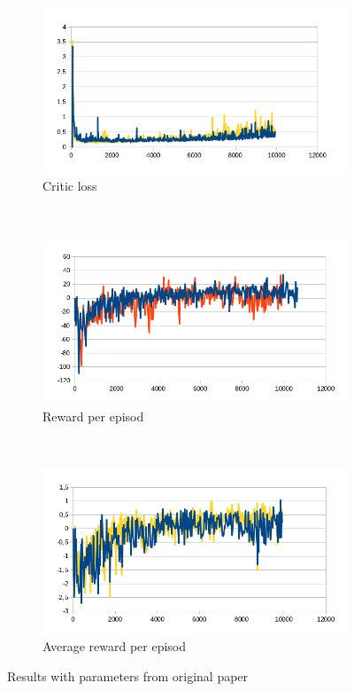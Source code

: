 \documentclass{article}
\begin{document}
\begin{figure}[ht]
  \centering
  \begin{subfigure}[b]{.3\textwidth}
    \includegraphics[width=\textwidth]{baselines_loss}
    \caption{Critic loss}
  \end{subfigure}
  ~
  \begin{subfigure}[b]{.3\textwidth}
    \includegraphics[width=\textwidth]{baselines_reward}
    \caption{Reward per episod}
  \end{subfigure}
  ~
  \begin{subfigure}[b]{.3\textwidth}
    \includegraphics[width=\textwidth]{baselines_avg_reward}
    \caption{Average reward per episod}
  \end{subfigure}
  \caption{Results with parameters from original paper}
  \label{fig:baselines}
\end{figure}
\end{document}
